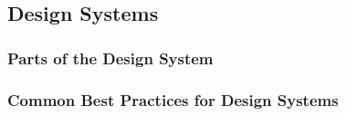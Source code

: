 \subsection{Design Systems}
\subsubsection{Parts of the Design System}
\subsubsection{Common Best Practices for Design Systems}